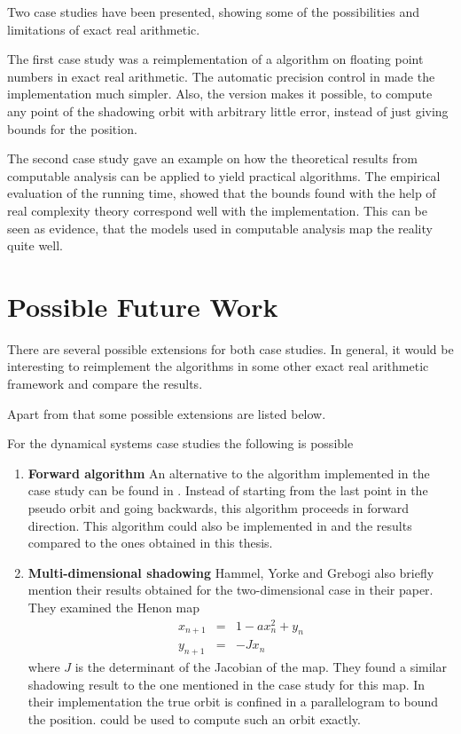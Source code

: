 Two case studies have been presented, showing some of the possibilities and
limitations of exact real arithmetic.

The first case study was a reimplementation of a algorithm on floating point
numbers in exact real arithmetic.
The automatic precision control in \irram made the implementation much simpler.
Also, the \irram version makes it possible, to compute any point of the
shadowing orbit with arbitrary little error, instead of just giving bounds for
the position.

The second case study gave an example on how the theoretical results from
computable analysis can be applied to yield practical algorithms. 
The empirical evaluation of the running time, showed that the bounds found with
the help of real complexity theory correspond well with the implementation.
This can be seen as evidence, that the models used in computable analysis
map the reality quite well.

\section{Possible Future Work}
There are several possible extensions for both case studies.
In general, it would be interesting to reimplement the algorithms in some other
exact real arithmetic framework and compare the results.

Apart from that some possible extensions are listed below.

For the dynamical systems case studies the following is possible
\begin{enumerate}
  \item \textbf{Forward algorithm}
    An alternative to the algorithm implemented in the case study can be found in \cite{chow1991}.
    Instead of starting from the last point in the pseudo orbit and going backwards, this algorithm proceeds in forward direction.
    This algorithm could also be implemented in \irram and the results compared
    to the ones obtained in this thesis.
  \item \textbf{Multi-dimensional shadowing}
    Hammel, Yorke and Grebogi also briefly mention their results obtained for
    the two-dimensional case in their paper.
    They examined the Henon map
    \begin{eqnarray*}
      x_{n+1} &=& 1-ax_n^2+y_n \\
      y_{n+1} &=& -Jx_n
    \end{eqnarray*}
    where $J$ is the determinant of the Jacobian of the map.
    They found a similar shadowing result to the one mentioned in the case
    study for this map.
    In their implementation the true orbit is confined in a parallelogram to
    bound the position.
    \irram could be used to compute such an orbit exactly.
\end{enumerate}

